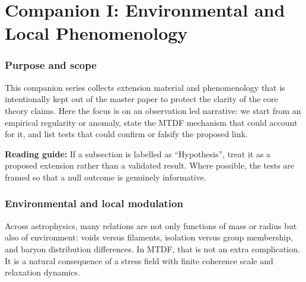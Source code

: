 \documentclass[11pt,a4paper]{article}
\begin{document}
\part{Companion I: Environmental and Local Phenomenology}

\begin{abstract}
This companion paper (Part I) presents the environmental and local modulation phenomenology of MTDF. Starting from the observation that many astrophysical relations depend on large-scale environment, we derive MTDF predictions for environment-dependent effective dynamics, the local Hubble expansion enhancement via void stress depletion, and the resulting scale factor S\textsubscript{0} = 1.084 that maps the Planck-calibrated global H\textsubscript{0} to local distance-ladder measurements. Each extension is clearly labelled as hypothesis or validated result, with explicit falsification criteria. All tests use the frozen parameter set \{$\alpha$, $\beta$, $\tau$\} established in the master paper (MTDF\_\allowbreak{}01).
\end{abstract}

\section{Purpose and scope}
\label{sec:purpose}
This companion series collects extension material and phenomenology that is intentionally kept out of the master paper to protect the clarity of the core theory claims.
Here the focus is on an observation led narrative: we start from an empirical regularity or anomaly, state the MTDF mechanism that could account for it, and list tests that could confirm or falsify the proposed link.

\begin{mdframed}[linecolor=accent,linewidth=0.5pt,backgroundcolor=callout-bg,leftline=true,rightline=true,topline=true,bottomline=true,innerleftmargin=8pt,innerrightmargin=8pt,innertopmargin=6pt,innerbottommargin=6pt]
\textbf{Reading guide:} If a subsection is labelled as ``Hypothesis'', treat it as a proposed extension rather than a validated result. Where possible, the tests are framed so that a null outcome is genuinely informative.
\end{mdframed}

\section{Environmental and local modulation}
\label{sec:env}
Across astrophysics, many relations are not only functions of mass or radius but also of environment: voids versus filaments, isolation versus group membership, and baryon distribution differences. In MTDF, that is not an extra complication. It is a natural consequence of a stress field with finite coherence scale and relaxation dynamics.
\end{document}
